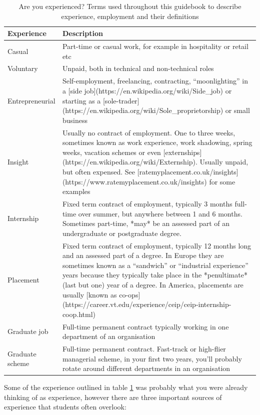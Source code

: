 \documentclass[
]{book}
\begin{document}
\begin{table}

\caption{\label{tab:jobterms}Are you experienced? Terms used throughout this guidebook to describe experience, employment and their definitions}
\centering
\begin{tabular}[t]{ll}
\toprule
Experience & Description\\
\midrule
Casual & Part-time or casual work, for example in hospitality or retail etc\\
Voluntary & Unpaid, both in technical and non-technical roles\\
Entrepreneurial & Self-employment, freelancing, contracting, “moonlighting” in a [side job](https://en.wikipedia.org/wiki/Side\_job) or starting as a [sole-trader](https://en.wikipedia.org/wiki/Sole\_proprietorship) or small business\\
Insight & Usually no contract of employment. One to three weeks, sometimes known as work experience, work shadowing, spring weeks, vacation schemes or even [externships](https://en.wikipedia.org/wiki/Externship). Usually unpaid, but often expensed. See [ratemyplacement.co.uk/insights](https://www.ratemyplacement.co.uk/insights) for some examples\\
Internship & Fixed term contract of employment, typically 3 months full-time over summer, but anywhere between 1 and 6 months. Sometimes part-time, *may* be an assessed part of an undergraduate or postgraduate degree.\\
\addlinespace
Placement & Fixed term contract of employment, typically 12 months long and an assessed part of a degree. In Europe they are sometimes known as a “sandwich” or “industrial experience” years because they typically take place in the *penultimate* (last but one) year of a degree. In America, placements are usually [known as co-ops](https://career.vt.edu/experience/ceip/ceip-internship-coop.html)\\
Graduate job & Full-time permanent contract typically working in one department of an organisation\\
Graduate scheme & Full-time permanent contract. Fast-track or high-flier managerial scheme, in your first two years, you'll probably rotate around different departments in an organisation\\
\bottomrule
\end{tabular}
\end{table}

Some of the experience outlined in table \ref{tab:jobterms} was probably what you were already thinking of as experience, however there are three important sources of experience that students often overlook:
\end{document}
